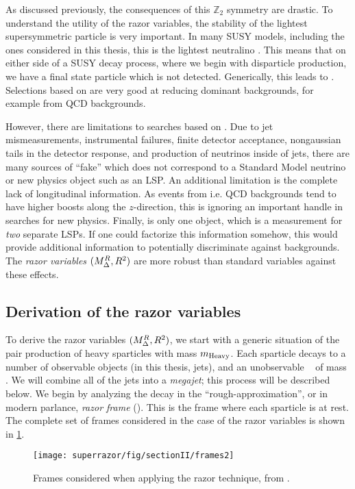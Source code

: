 As discussed previously, the consequences of this $\mathbb{Z}_2$ symmetry are drastic.
To understand the utility of the razor variables, the stability of the lightest supersymmetric particle is very important.
In many SUSY models, including the ones considered in this thesis, this is the lightest neutralino \lsp.
This means that on either side of a SUSY decay process, where we begin with disparticle production, we have a final state particle which is not detected.
Generically, this leads to \met.
Selections based on \met are very good at reducing dominant backgrounds, for example from QCD backgrounds.

However, there are limitations to searches based on \met.
Due to jet mismeasurements, instrumental failures, finite detector acceptance, nongaussian tails in the detector response, and production of neutrinos inside of jets, there are many sources of ``fake'' \met which does not correspond to a Standard Model neutrino or new physics object such as an LSP.
An additional limitation is the complete lack of longitudinal information.
As events from i.e. QCD backgrounds tend to have higher boosts along the $z$-direction, this is ignoring an important handle in searches for new physics.
Finally, \met is only one object, which is a measurement for \textit{two} separate LSPs.
If one could factorize this information somehow, this would provide additional information to potentially discriminate against backgrounds.
The \textit{razor variables} $(M_{\Delta}^{R}, R^2)$ are more robust than standard variables against these effects\cite{Rogan:2010kb,Buckley:2013kua}.

\subsection{Derivation of the razor variables}

To derive the razor variables $(M_{\Delta}^{R}, R^2)$, we start with a generic situation of the pair production of heavy sparticles with mass $m_{\mathrm{Heavy}}$.\footnotemark
{}
Each sparticle decays to a number of observable objects (in this thesis, jets), and an unobservable \lsp~ of mass \mlsp.
We will combine all of the jets into a \textit{megajet}; this process will be described below.
We begin by analyzing the decay in the ``rough-approximation'', or in modern parlance, \textit{razor frame} (\rframe).
This is the frame where each sparticle is at rest.
The complete set of frames considered in the case of the razor variables is shown in \ref{fig:razor_frames}.
\begin{figure}
\caption{Frames considered when applying the razor technique, from \cite{Buckley:2013kua}.} \label{fig:razor_frames}
\texttt{[image: superrazor/fig/sectionII/frames2]}
\end{figure}


